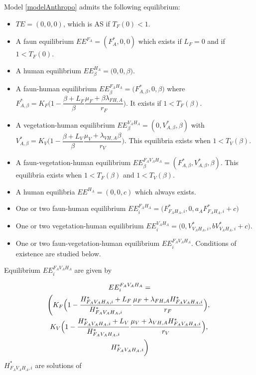 \documentclass{article}
\newcommand{\lfa}{\lambda_{FH, A}}
\newcommand{\lva}{\lambda_{VH, A}}
\begin{document}
Model \eqref{modelAnthropo} admits the following equilibrium:
\begin{itemize}
\item $TE = (0,0,0)$, which is AS if $T_F(0) < 1$.
\item A faun equilibrium $EE^{F_A} = (F_A^*, 0, 0)$ which exists if $L_F = 0$ and if $1 < T_F(0)$.
\item A human equilibrium $EE^{H_A}_\beta = \Big(0,0,\beta \Big)$.
\item A faun-human equilibrium $EE^{F_AH_A}_\beta = \Big(F^*_{A, \beta}, 0, \beta\Big)$ where $F^*_{A, \beta} = K_F \Big(1-\dfrac{\beta + L_F}{\beta}\dfrac{\mu_F + \beta \lfa}{r_F} \Big)$. It exists if $1 < T_F(\beta)$.
\item A vegetation-human equilibrium $EE^{V_AH_A}_\beta = (0, V_{A, \beta}^*, \beta)$ with $V_{A, \beta}^* = K_V \Big( 1- \dfrac{\beta + L_V}{\beta} \dfrac{\mu_V + \lva \beta}{r_V} \Big)$. This equilibria exists when $1 < T_V(\beta)$.
\item A faun-vegetation-human equilibrium $EE^{F_AV_AH_A}_\beta = (F^*_{A, \beta}, V_{A, \beta}^*, \beta)$. This equilibria exists when $1 < T_F(\beta)$ and $1 < T_V(\beta)$.
\item A human equilibria $EE^{H_A} = (0, 0, c)$ which always exists.
\item One or two faun-human equilibrium $EE^{F_AH_A}_i = \Big(F^*_{F_AH_A, i}, 0, a_A F^*_{F_AH_A, i}+c\Big)$ 
\item One or two vegetation-human equilibrium $EE^{V_AH_A}_i = \Big(0, V^*_{V_AH_A, i}, bV^*_{V_AH_A, i}+c \Big)$.
\item One or two faun-vegetation-human equilibrium $EE^{F_AV_AH_A}_i$. Conditions of existence are studied below. 
\end{itemize}


Equilibrium $EE^{F_AV_AH_A}_i$ are given by 

\begin{multline}
EE^{F_AV_AH_A}_i =\\ \left(K_F \Big(1 - \dfrac{H^*_{F_AV_AH_A,i} + L_F}{H^*_{F_AV_AH_A,i}}\dfrac{\mu_F + \lfa H^*_{F_AV_AH_A,i}}{r_F}\Big), \right. \\ \left. \vphantom{\dfrac{H}{H}} K_V \Big(1 - \dfrac{H^*_{F_AV_AH_A,i} + L_V}{H^*_{F_AV_AH_A,i}}\dfrac{\mu_V + \lva H^*_{F_AV_AH_A,i}}{r_V}\Big), \right. \\ \left. \vphantom{\dfrac{H}{H}} H^*_{F_AV_AH_A,i} \right)
\end{multline}
$H^*_{F_AV_AH_A,i}$ are solutions of
\end{document}
